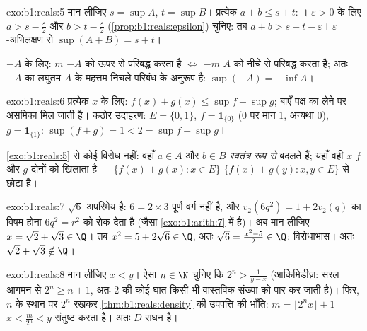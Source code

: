\begin{solution}{exo:b1:reals:5}
मान लीजिए $s = \sup A$, $t = \sup B$। प्रत्येक $a + b \leq s + t$: । $\varepsilon > 0$ के लिए $a > s - \frac\varepsilon2$ और $b > t -
\frac\varepsilon2$ (\cref{prop:b1:reals:epsilon}) चुनिए: तब $a + b > s + t -
\varepsilon$। $\varepsilon$-अभिलक्षण से $\sup(A+B) = s + t$।

$-A$ के लिए: $m$ $-A$ को ऊपर से परिबद्ध करता है $\iff$ $-m$ $A$ को नीचे से
परिबद्ध करता है; अतः $-A$ का लघुतम  $A$ के महत्तम निचले परिबंध के
अनुरूप है: $\sup(-A) = -\inf A$।
\end{solution}

\begin{solution}{exo:b1:reals:6}
प्रत्येक $x$ के लिए: $f(x) + g(x) \leq \sup f + \sup g$; बाएँ पक्ष का 
लेने पर असमिका मिल जाती है। कठोर उदाहरण: $E = \{0, 1\}$, $f =
\mathbf{1}_{\{0\}}$ ($0$ पर मान $1$, अन्यथा $0$), $g = \mathbf{1}_{\{1\}}$:
$\sup(f + g) = 1 < 2 = \sup f + \sup g$।

\cref{exo:b1:reals:5} से कोई विरोध नहीं: वहाँ $a \in A$ और $b \in B$
\emph{स्वतंत्र रूप से} बदलते हैं; यहाँ वही $x$ $f$ और $g$ दोनों को खिलाता है
---  $\{f(x) + g(x) : x \in E\}$  $\{f(x) + g(y) : x, y \in
E\}$ से छोटा है।
\end{solution}

\begin{solution}{exo:b1:reals:7}
$\sqrt 6$ अपरिमेय है: $6 = 2 \times 3$ पूर्ण वर्ग नहीं है, और $v_2(6q^2) = 1
+ 2v_2(q)$ का विषम होना $6q^2 = r^2$ को रोक देता है (जैसा
\cref{exo:b1:arith:7} में है)। अब मान लीजिए $x = \sqrt 2 + \sqrt 3 \in \Q$।
तब $x^2 = 5 + 2\sqrt 6 \in \Q$, अतः $\sqrt 6 = \frac{x^2 - 5}{2} \in \Q$:
विरोधाभास। अतः $\sqrt 2 + \sqrt 3 \notin \Q$।
\end{solution}

\begin{solution}{exo:b1:reals:8}
मान लीजिए $x < y$। ऐसा $n \in \N$ चुनिए कि $2^n > \frac{1}{y - x}$
(आर्किमिडीज़: सरल आगमन से $2^n \geq n + 1$, अतः $2$ की कोई घात किसी भी
वास्तविक संख्या को पार कर जाती है)। फिर, $n$ के स्थान पर $2^n$ रखकर
\cref{thm:b1:reals:density} की उपपत्ति की भाँति: $m = \lfloor 2^n x \rfloor
+ 1$ $x < \frac{m}{2^n} < y$ संतुष्ट करता है। अतः $D$ सघन है।
\end{solution}

